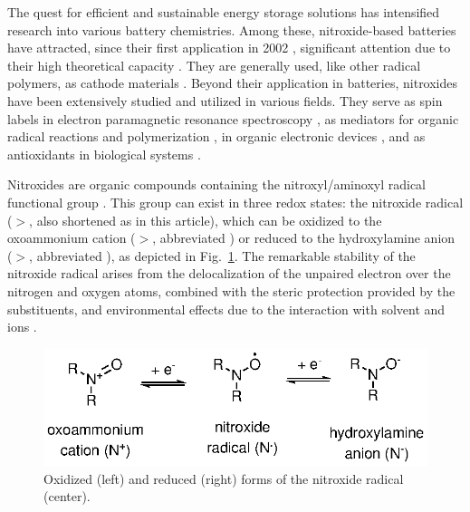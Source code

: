 \documentclass[review,preprint]{elsarticle}
\begin{document}
The quest for efficient and sustainable energy storage solutions has intensified research into various battery chemistries. Among these, nitroxide-based batteries have attracted, since their first application in 2002 \cite{nakaharaRechargeableBatteriesOrganic2002}, significant attention due to their high theoretical capacity \cite{friebeSustainableEnergyStorage2019,ernouldNitroxidesBatteryrelatedApplications2021,keDesigningStrategiesAdvanced2023}. They are generally used, like other radical polymers, as cathode materials \cite{okaRadicalPolymersRechargeable2020a,assummaNewConductingCopolymer2020}. Beyond their application in batteries, nitroxides have been extensively studied and utilized in various fields. They serve as spin labels in electron paramagnetic resonance spectroscopy \cite{torricellaNitroxideSpinLabels2021}, as mediators for organic radical reactions and polymerization \cite{tebbenNitroxidesApplicationsSynthesis2011,leifertOrganicSynthesisUsing2023}, in organic electronic devices \cite{jiAirStableOrganicRadicals2020,xieNitroxideRadicalPolymers2021}, and as antioxidants in biological systems  \cite{souleChemistryBiologyNitroxide2007,lewandowskiNitroxidesAntioxidantsAnticancer2017,prescottBiologicalRelevanceFree2017}.

Nitroxides are organic compounds containing the nitroxyl/aminoxyl radical functional group \cite{berlinerHistoryUseNitroxides2012}. This group can exist in three redox states: the nitroxide radical ($>$, also shortened as  in this article), which can be oxidized to the oxoammonium cation ($>$, abbreviated ) or reduced to the hydroxylamine anion ($>$, abbreviated ), as depicted in Fig.~\ref{fig:states}. The remarkable stability of the nitroxide radical arises from the delocalization of the unpaired electron over the nitrogen and oxygen atoms, combined with the steric protection provided by the substituents, and environmental effects due to the interaction with solvent and ions \cite{grynovaOriginScopeLongRange2013,grynovaSwitchingRadicalStability2013}. 

\begin{figure}[!h]
	\centering
	\includegraphics[width=.7\linewidth]{Figure1}
	\caption{Oxidized (left) and reduced (right) forms of  the nitroxide radical (center).}
	\label{fig:states}
\end{figure}
\end{document}
